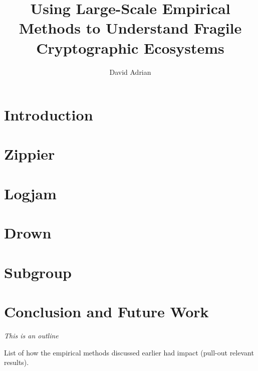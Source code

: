 \documentclass[doublespace]{styles/rackham-thesis}
\begin{document}
\title{Using Large-Scale Empirical Methods to Understand Fragile Cryptographic Ecosystems}
\author{David Adrian}

\maketitle




\tableofcontents
\listoffigures
\listoftables
\listofappendices



\chapter{Introduction}


\chapter{Zippier}
\label{chapter:zippier}

\chapter{Logjam}
\label{chapter:logjam}

\chapter{Drown}
\label{chapter:drown}

\chapter{Subgroup}
\label{chapter:subgroup}


\chapter{Conclusion and Future Work}
\label{chapter:conclusion}

\textit{This is an outline}

List of how the empirical methods discussed earlier had impact
(pull-out relevant results).
\end{document}
